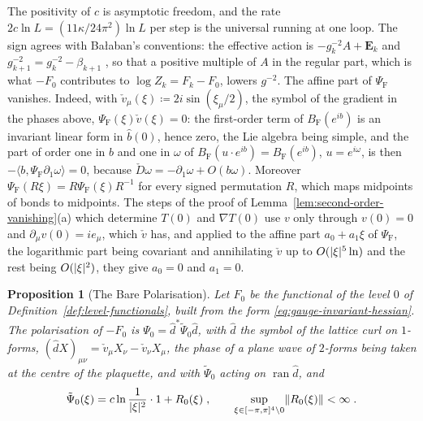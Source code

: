 \documentclass[11pt]{preprint}
\DeclarePairedDelimiter{\abs}{\lvert}{\rvert}
\DeclarePairedDelimiter{\norm}{\lVert}{\rVert}
\numberwithin{equation}{section}
\theoremstyle{definition}
\theoremstyle{remark}
\theoremstyle{plain}
\newtheorem{auxproposition}[lemma]{Proposition}
\begin{document}
The positivity of $c$ is asymptotic freedom, and the rate $2c\ln L = (11\kappa/24\pi^2)\ln L$ per step is the universal running at one loop. The sign agrees with Ba{\l}aban's conventions: the effective action is $-g_k^{-2}A + \mathbf E_k$ and $g_{k+1}^{-2} = g_k^{-2} - \beta_{k+1}$ \cite[(0.20), (0.22), p.~256]{BalabanRG1}, so that a positive multiple of $A$ in the regular part, which is what $-F_0$ contributes to $\log Z_k = F_k - F_0$, lowers $g^{-2}$. The affine part of $\Psi_{\mathrm F}$ vanishes. Indeed, with $\check v_\mu(\xi) \coloneqq 2i\sin(\xi_\mu/2)$, the symbol of the gradient in the phases above, $\Psi_{\mathrm F}(\xi)\check v(\xi) = 0$: the first-order term of $B_{\mathrm F}(e^{ib})$ is an invariant linear form in $\hat b(0)$, hence zero, the Lie algebra being simple, and the part of order one in $b$ and one in $\omega$ of $B_{\mathrm F}(u\cdot e^{ib}) = B_{\mathrm F}(e^{ib})$, $u = e^{i\omega}$, is then $-\langle b, \Psi_{\mathrm F}\partial_1\omega\rangle = 0$, because $\check D\omega = -\partial_1\omega + O(b\omega)$. Moreover $\Psi_{\mathrm F}(R\xi) = R\Psi_{\mathrm F}(\xi)R^{-1}$ for every signed permutation $R$, which maps midpoints of bonds to midpoints. The steps of the proof of Lemma~\ref{lem:second-order-vanishing}(a) which determine $T(0)$ and $\nabla T(0)$ use $v$ only through $v(0) = 0$ and $\partial_\mu v(0) = ie_\mu$, which $\check v$ has, and applied to the affine part $a_0 + a_1\xi$ of $\Psi_{\mathrm F}$, the logarithmic part being covariant and annihilating $\check v$ up to $O(\abs{\xi}^5\ln)$ and the rest being $O(\abs{\xi}^2)$, they give $a_0 = 0$ and $a_1 = 0$.

\begin{auxproposition}[The Bare Polarisation]\label{prop:bare-polarisation}
Let $F_0$ be the functional of the level $0$ of Definition~\ref{def:level-functionals}, built from the form \eqref{eq:gauge-invariant-hessian}. The polarisation of $-F_0$ is $\Psi_0 = \hat d^*\tilde\Psi_0\hat d$, with $\hat d$ the symbol of the lattice curl on $1$-forms, $(\hat dX)_{\mu\nu} = \check v_\mu X_\nu - \check v_\nu X_\mu$, the phase of a plane wave of $2$-forms being taken at the centre of the plaquette, and with $\tilde\Psi_0$ acting on $\operatorname{ran}\hat d$, and
\begin{equation}\label{eq:bare-polarisation}
    \tilde\Psi_0(\xi) = c\ln\frac{1}{\abs{\xi}^2}\cdot 1 + R_0(\xi)\;,
    \qquad
    \sup_{\xi \in [-\pi,\pi]^4 \setminus 0}\norm{R_0(\xi)} < \infty\;.
\end{equation}
\end{auxproposition}
\end{document}
